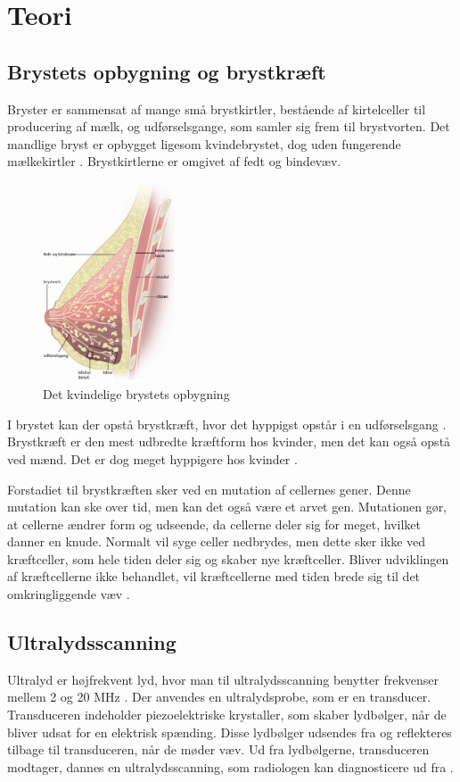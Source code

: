 \chapter{Teori}\label{Teori}

\section{Brystets opbygning og brystkræft}
Bryster er sammensat af mange små brystkirtler, bestående af kirtelceller til producering af mælk, og udførselsgange, som samler sig frem til brystvorten. Det mandlige bryst er opbygget ligesom kvindebrystet, dog uden fungerende mælkekirtler \cite{Mand}. Brystkirtlerne er omgivet af fedt og bindevæv\cite{Bryst}.

\begin{figure}[H]
    \centering
    \includegraphics[width=0.35\textwidth]{figurer/r/bryst}
    \caption{Det kvindelige brystets opbygning \cite{Bryst}}
    \label{Brystet}
\end{figure}

I brystet kan der opstå brystkræft, hvor det hyppigst opstår i en udførselsgang \citep{Bryst}. Brystkræft er den mest udbredte kræftform hos kvinder, men det kan også opstå ved mænd. Det er dog meget hyppigere hos kvinder \cite{Mand}.

Forstadiet til brystkræften sker ved en mutation af cellernes gener. Denne mutation kan ske over tid, men kan det også være et arvet gen. Mutationen gør, at cellerne ændrer form og udseende, da cellerne deler sig for meget, hvilket danner en knude. Normalt vil syge celler nedbrydes, men dette sker ikke ved kræftceller, som hele tiden deler sig og skaber nye kræftceller. Bliver udviklingen af kræftcellerne ikke behandlet, vil kræftcellerne med tiden brede sig til det omkringliggende væv \cite{Udvikling}. 

\section{Ultralydsscanning}
Ultralyd er højfrekvent lyd, hvor man til ultralydsscanning benytter frekvenser mellem 2 og 20 MHz \cite{Frekvens}. Der anvendes en ultralydsprobe, som er en transducer. Transduceren indeholder piezoelektriske krystaller, som skaber lydbølger, når de bliver udsat for en elektrisk spænding. Disse lydbølger udsendes fra og reflekteres tilbage til transduceren, når de møder væv. Ud fra lydbølgerne, transduceren modtager, dannes en ultralydsscanning, som radiologen kan diagnosticere ud fra \cite{Ultralydsscanning}.

